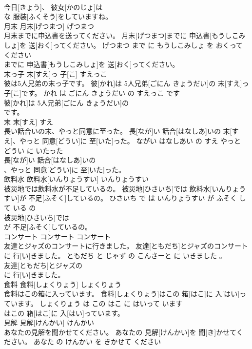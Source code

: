 \documentclass[8pt]{extreport}
\begin{document}
\begin{CJK}{UTF8}{min}
\\	今日[きょう]、 彼女[かのじょ]は
\\	な 服装[ふくそう]をしていますね。			
\\	月末	月末[げつまつ]	げつまつ	
\\	月末までに申込書を送ってください。	月末[げつまつ]までに 申込書[もうしこみしょ]を 送[おく]ってください。	げつまつ まで に もうしこみしょ を おくって ください	
\\	までに 申込書[もうしこみしょ]を 送[おく]ってください。			
\\	末っ子	末[すえ]っ 子[こ]	すえっこ	
\\	彼は5人兄弟の末っ子です。	彼[かれ]は 5人兄弟[ごにん きょうだい]の 末[すえ]っ 子[こ]です。	かれ は ごにん きょうだい の すえっこ です	
\\	彼[かれ]は 5人兄弟[ごにん きょうだい]の
\\	です。			
\\	末	末[すえ]	すえ	
\\	長い話合いの末、やっと同意に至った。	長[なが]い 話合[はなしあ]いの 末[すえ]、やっと 同意[どうい]に 至[いた]った。	ながい はなしあい の すえ やっと どうい に いたった	
\\	長[なが]い 話合[はなしあ]いの
\\	、やっと 同意[どうい]に 至[いた]った。			
\\	飲料水	飲料水[いんりょうすい]	いんりょうすい	
\\	被災地では飲料水が不足しているの。	被災地[ひさいち]では 飲料水[いんりょうすい]が 不足[ふそく]しているの。	ひさいち で は いんりょうすい が ふそく して いる の	
\\	被災地[ひさいち]では
\\	が 不足[ふそく]しているの。			
\\	コンサート	コンサート	コンサート	
\\	友達とジャズのコンサートに行きました。	友達[ともだち]とジャズのコンサートに 行[い]きました。	ともだち と じゃず の こんさーと に いきました 。	
\\	友達[ともだち]とジャズの
\\	に 行[い]きました。			
\\	食料	食料[しょくりょう]	しょくりょう	
\\	食料はこの箱に入っています。	食料[しょくりょう]はこの 箱[はこ]に 入[はい]っています。	しょくりょう は この はこ に はいって います	
\\	はこの 箱[はこ]に 入[はい]っています。			
\\	見解	見解[けんかい]	けんかい	
\\	あなたの見解を聞かせてください。	あなたの 見解[けんかい]を 聞[き]かせてください。	あなた の けんかい を きかせて ください	

\end{CJK}
\end{document}
